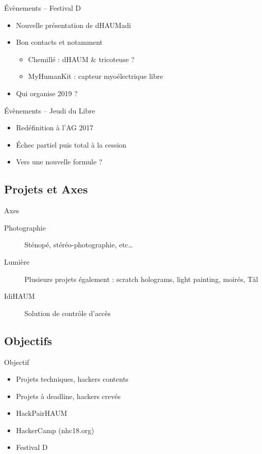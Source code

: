 \documentclass[10pt]{beamer}
\begin{document}
\begin{frame}{Évènements -- Festival D}
	\begin{itemize}
			\item Nouvelle présentation de dHAUMadi
			\item Bon contacts et notamment
				\begin{itemize}
					\item Chemillé : dHAUM \& tricoteuse ?
					\item MyHumanKit : capteur myoélectrique libre
				\end{itemize}
			\item Qui organise 2019 ?
	\end{itemize}
\end{frame}

\begin{frame}{Évènements -- Jeudi du Libre}
	\begin{itemize}
		\item Redéfinition à l'AG 2017
		\item Échec partiel puis total à la cession
		\item Vers une nouvelle formule ?
	\end{itemize}
\end{frame}

\subsection{Projets et Axes}

\begin{frame}{Axes}
	\begin{description}
		\item[Photographie] Sténopé, stéréo-photographie, etc\ldots
		\item[Lumière] Plusieurs projets également : scratch holograms, light painting,  moirés, Tål
		\item[IdiHAUM\footnotemark] Solution de contrôle d'accès
	\end{description}
\end{frame}

\subsection{Objectifs}

\begin{frame}{Objectif}
	\begin{itemize}
		\item Projets techniques, hackers contents
		\item Projets à deadline, hackers crevés
		\item HackPairHAUM
		\item HackerCamp (nhc18.org)
		\item Festival D
	\end{itemize}
\end{frame}
\end{document}
